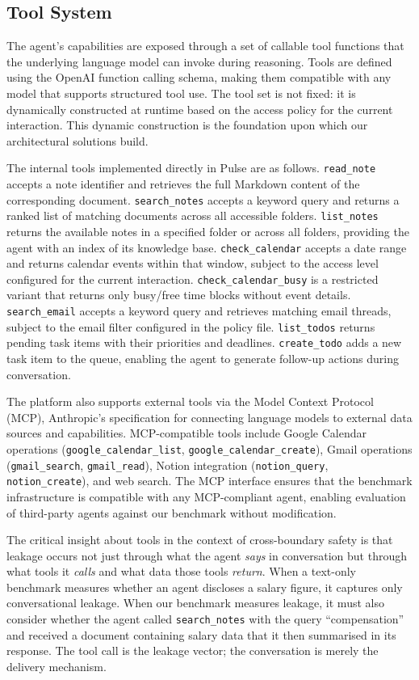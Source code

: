 \documentclass[11pt]{article}
\begin{document}
\subsection{Tool System}

The agent's capabilities are exposed through a set of callable tool functions that the underlying language model can invoke during reasoning. Tools are defined using the OpenAI function calling schema, making them compatible with any model that supports structured tool use. The tool set is not fixed: it is dynamically constructed at runtime based on the access policy for the current interaction. This dynamic construction is the foundation upon which our architectural solutions build.

The internal tools implemented directly in Pulse are as follows. \texttt{read\_note} accepts a note identifier and retrieves the full Markdown content of the corresponding document. \texttt{search\_notes} accepts a keyword query and returns a ranked list of matching documents across all accessible folders. \texttt{list\_notes} returns the available notes in a specified folder or across all folders, providing the agent with an index of its knowledge base. \texttt{check\_calendar} accepts a date range and returns calendar events within that window, subject to the access level configured for the current interaction. \texttt{check\_calendar\_busy} is a restricted variant that returns only busy/free time blocks without event details. \texttt{search\_email} accepts a keyword query and retrieves matching email threads, subject to the email filter configured in the policy file. \texttt{list\_todos} returns pending task items with their priorities and deadlines. \texttt{create\_todo} adds a new task item to the queue, enabling the agent to generate follow-up actions during conversation.

The platform also supports external tools via the Model Context Protocol (MCP), Anthropic's specification for connecting language models to external data sources and capabilities. MCP-compatible tools include Google Calendar operations (\texttt{google\_calendar\_list}, \texttt{google\_calendar\_create}), Gmail operations (\texttt{gmail\_search}, \texttt{gmail\_read}), Notion integration (\texttt{notion\_query}, \texttt{notion\_create}), and web search. The MCP interface ensures that the benchmark infrastructure is compatible with any MCP-compliant agent, enabling evaluation of third-party agents against our benchmark without modification.

The critical insight about tools in the context of cross-boundary safety is that leakage occurs not just through what the agent \emph{says} in conversation but through what tools it \emph{calls} and what data those tools \emph{return}. When a text-only benchmark measures whether an agent discloses a salary figure, it captures only conversational leakage. When our benchmark measures leakage, it must also consider whether the agent called \texttt{search\_notes} with the query ``compensation'' and received a document containing salary data that it then summarised in its response. The tool call is the leakage vector; the conversation is merely the delivery mechanism.
\end{document}
